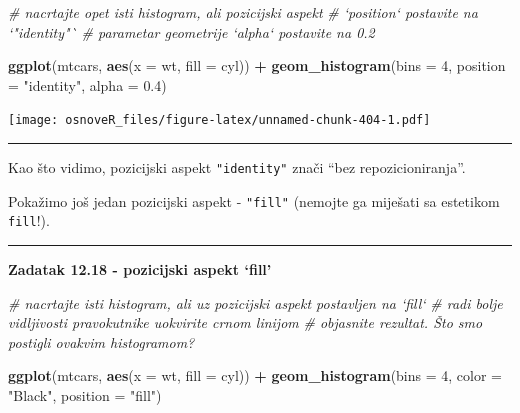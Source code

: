 \documentclass[]{book}
\newenvironment{Shaded}{\begin{snugshade}}{\end{snugshade}}
\newcommand{\KeywordTok}[1]{\textcolor[rgb]{0.13,0.29,0.53}{\textbf{#1}}}
\newcommand{\DataTypeTok}[1]{\textcolor[rgb]{0.13,0.29,0.53}{#1}}
\newcommand{\DecValTok}[1]{\textcolor[rgb]{0.00,0.00,0.81}{#1}}
\newcommand{\FloatTok}[1]{\textcolor[rgb]{0.00,0.00,0.81}{#1}}
\newcommand{\StringTok}[1]{\textcolor[rgb]{0.31,0.60,0.02}{#1}}
\newcommand{\CommentTok}[1]{\textcolor[rgb]{0.56,0.35,0.01}{\textit{#1}}}
\newcommand{\OperatorTok}[1]{\textcolor[rgb]{0.81,0.36,0.00}{\textbf{#1}}}
\newcommand{\NormalTok}[1]{#1}
\theoremstyle{definition}
\theoremstyle{definition}
\theoremstyle{definition}
\theoremstyle{remark}
\begin{document}
\begin{Shaded}
\begin{Highlighting}[]
\CommentTok{# nacrtajte opet isti histogram, ali pozicijski aspekt }
\CommentTok{# `position` postavite na `"identity"`}
\CommentTok{# parametar geometrije `alpha` postavite na 0.2 }
\end{Highlighting}
\end{Shaded}

\begin{Shaded}
\begin{Highlighting}[]
\KeywordTok{ggplot}\NormalTok{(mtcars, }\KeywordTok{aes}\NormalTok{(}\DataTypeTok{x =}\NormalTok{ wt, }\DataTypeTok{fill =}\NormalTok{ cyl)) }\OperatorTok{+}\StringTok{ }
\StringTok{  }\KeywordTok{geom_histogram}\NormalTok{(}\DataTypeTok{bins =} \DecValTok{4}\NormalTok{, }\DataTypeTok{position =} \StringTok{"identity"}\NormalTok{, }\DataTypeTok{alpha =} \FloatTok{0.4}\NormalTok{)}
\end{Highlighting}
\end{Shaded}

\texttt{[image: osnoveR\_files/figure-latex/unnamed-chunk-404-1.pdf]}

\begin{center}\rule{0.5\linewidth}{\linethickness}\end{center}

Kao što vidimo, pozicijski aspekt \texttt{"identity"} znači ``bez
repozicioniranja''.

Pokažimo još jedan pozicijski aspekt - \texttt{"fill"} (nemojte ga
miješati sa estetikom \texttt{fill}!).

\begin{center}\rule{0.5\linewidth}{\linethickness}\end{center}

\textbf{Zadatak 12.18 - pozicijski aspekt `fill'}

\begin{Shaded}
\begin{Highlighting}[]
\CommentTok{# nacrtajte isti histogram, ali uz pozicijski aspekt postavljen na `fill`}
\CommentTok{# radi bolje vidljivosti pravokutnike uokvirite crnom linijom}
\CommentTok{# objasnite rezultat. Što smo postigli ovakvim histogramom?}
\end{Highlighting}
\end{Shaded}

\begin{Shaded}
\begin{Highlighting}[]
\KeywordTok{ggplot}\NormalTok{(mtcars, }\KeywordTok{aes}\NormalTok{(}\DataTypeTok{x =}\NormalTok{ wt, }\DataTypeTok{fill =}\NormalTok{ cyl)) }\OperatorTok{+}\StringTok{ }
\StringTok{  }\KeywordTok{geom_histogram}\NormalTok{(}\DataTypeTok{bins =} \DecValTok{4}\NormalTok{, }\DataTypeTok{color =} \StringTok{"Black"}\NormalTok{, }\DataTypeTok{position =} \StringTok{"fill"}\NormalTok{)}
\end{Highlighting}
\end{Shaded}
\end{document}

